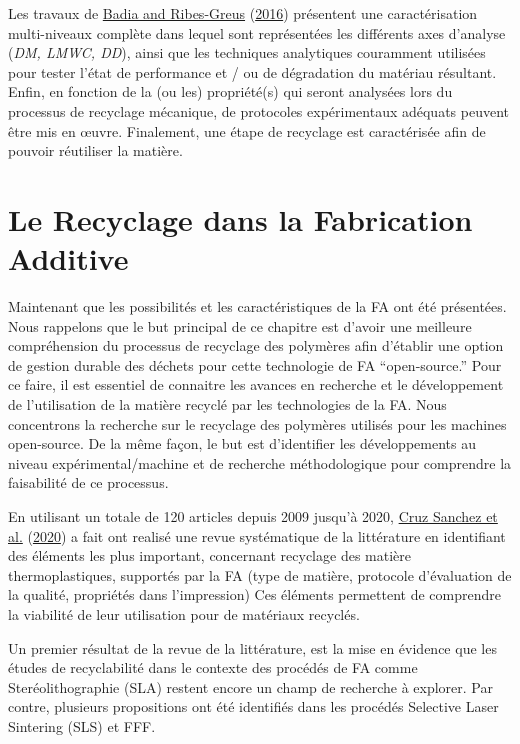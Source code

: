 \documentclass[
]{article}
\begin{document}
Les travaux de \protect\hyperlink{ref-Badia2016}{Badia and Ribes-Greus} (\protect\hyperlink{ref-Badia2016}{2016}) présentent une caractérisation multi-niveaux complète dans lequel sont représentées les différents axes d'analyse (\emph{DM, LMWC, DD}), ainsi que les techniques analytiques couramment utilisées pour tester l'état de performance et / ou de dégradation du matériau résultant. Enfin, en fonction de la (ou les) propriété(s) qui seront analysées lors du processus de recyclage mécanique, de protocoles expérimentaux adéquats peuvent être mis en œuvre.
Finalement, une étape de recyclage est caractérisée afin de pouvoir réutiliser la matière.

\hypertarget{le-recyclage-dans-la-fabrication-additive}{%
\section{Le Recyclage dans la Fabrication Additive}\label{le-recyclage-dans-la-fabrication-additive}}

Maintenant que les possibilités et les caractéristiques de la FA ont été présentées. Nous rappelons que le but principal de ce chapitre est d'avoir une meilleure compréhension du processus de recyclage des polymères afin d'établir une option de gestion durable des déchets pour cette technologie de FA ``open-source.''
Pour ce faire, il est essentiel de connaitre les avances en recherche et le développement de l'utilisation de la matière recyclé par les technologies de la FA. Nous concentrons la recherche sur le recyclage des polymères utilisés pour les machines open-source. De la même façon, le but est d'identifier les développements au niveau expérimental/machine et de recherche méthodologique pour comprendre la faisabilité de ce processus.

En utilisant un totale de 120 articles depuis 2009 jusqu'à 2020, \protect\hyperlink{ref-CruzSanchez2020}{Cruz Sanchez et al.} (\protect\hyperlink{ref-CruzSanchez2020}{2020}) a fait ont realisé une revue systématique de la littérature en identifiant des éléments les plus important, concernant recyclage des matière thermoplastiques, supportés par la FA (type de matière, protocole d'évaluation de la qualité, propriétés dans l'impression) Ces éléments permettent de comprendre la viabilité de leur utilisation pour de matériaux recyclés.

Un premier résultat de la revue de la littérature, est la mise en évidence que les études de recyclabilité dans le contexte des procédés de FA comme Steréolithographie (SLA) restent encore un champ de recherche à explorer. Par contre, plusieurs propositions ont été identifiés dans les procédés Selective Laser Sintering (SLS) et FFF.
\end{document}
